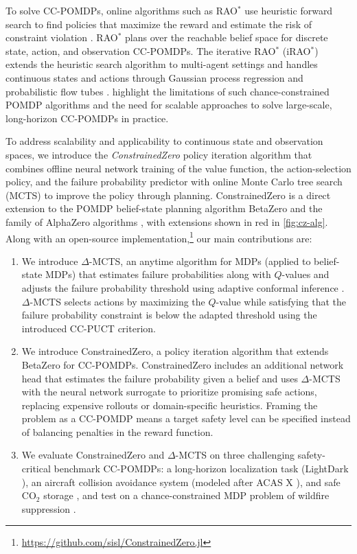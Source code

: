 To solve CC-POMDPs, online algorithms such as RAO$^*$ use heuristic forward search to find policies that maximize the reward and estimate the risk of constraint violation \cite{santana2016rao}.
RAO$^*$ plans over the reachable belief space for discrete state, action, and observation CC-POMDPs.
The iterative RAO$^*$ (iRAO$^*$) extends the heuristic search algorithm to multi-agent settings and handles continuous states and actions through Gaussian process regression and probabilistic flow tubes \cite{huang2018hybrid}.
\textcite{lauri2022partially} highlight the limitations of such chance-constrained POMDP algorithms and the need for scalable approaches to solve large-scale, long-horizon CC-POMDPs in practice. 

To address scalability and applicability to continuous state and observation spaces, we introduce the \textit{ConstrainedZero} policy iteration algorithm that combines offline neural network training of the value function, the action-selection policy, and the failure probability predictor with online Monte Carlo tree search (MCTS) to improve the policy through planning.
ConstrainedZero is a direct extension to the POMDP belief-state planning algorithm BetaZero and the family of AlphaZero algorithms \cite{silver2018general}, with extensions shown in red in \cref{fig:cz-alg}.
Along with an open-source implementation,\footnote{\url{https://github.com/sisl/ConstrainedZero.jl}} our main contributions are:
\begin{enumerate}
    \item We introduce $\Delta$-MCTS, an anytime algorithm for MDPs (applied to belief-state MDPs) that estimates failure probabilities along with $Q$-values and adjusts the failure probability threshold using adaptive conformal inference \cite{gibbs2021adaptive}. $\Delta$-MCTS selects actions by maximizing the $Q$-value while satisfying that the failure probability constraint is below the adapted threshold using the introduced CC-PUCT criterion.
    \item We introduce ConstrainedZero, a policy iteration algorithm that extends BetaZero for CC-POMDPs. ConstrainedZero includes an additional network head that estimates the failure probability given a belief and uses $\Delta$-MCTS with the neural network surrogate to prioritize promising safe actions, replacing expensive rollouts or domain-specific heuristics.
    Framing the problem as a CC-POMDP means a target safety level can be specified instead of balancing penalties in the reward function.
    \item We evaluate ConstrainedZero and $\Delta$-MCTS on three challenging safety-critical benchmark CC-POMDPs: a long-horizon localization task (LightDark \cite{platt2010belief}), an aircraft collision avoidance system (modeled after ACAS X \cite{kochenderfer2012next}), and safe CO$_2$ storage \cite{corso2022pomdp}, and test on a chance-constrained MDP problem of wildfire suppression \cite{griffith2017automated}.
\end{enumerate}


